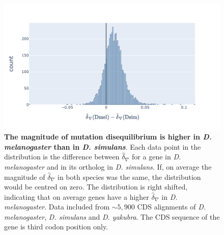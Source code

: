 \begin{figure}[h]
\centering
\includegraphics[width=	\textwidth]{figures/plots/drosophila/d-conv-diff.pdf}
\caption{\textbf{The magnitude of mutation disequilibrium is higher in \textit{D. melanogaster} than in \textit{D. simulans}}. Each data point in the distribution is the difference between $\hat\delta_\nabla$ for a gene in \textit{D. melanogaster} and in its ortholog in \textit{D. simulans}.   If, on average the magnitude of $\hat\delta_\nabla$ in both species was the same, the distribution would be centred on zero. The distribution is right shifted, indicating that on average genes have a higher $\hat\delta_\nabla$ in \textit{D. melanogaster}. Data included from $\sim 5,900$ CDS alignments of \textit{D. melanogaster}, \textit{D. simulans} and \textit{D. yakubra}. The CDS sequence of the gene is third codon position only.}
\label{fig:drosophila_d-conv-diff}
\end{figure}
